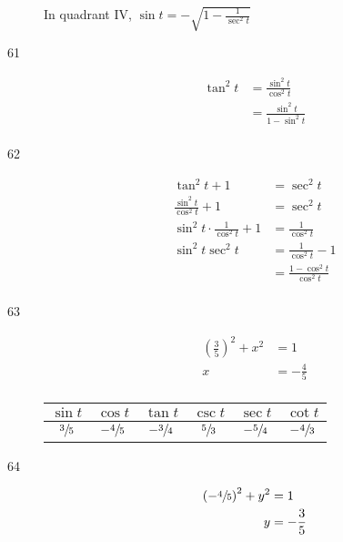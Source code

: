 \documentclass{exam}
\begin{document}
\begin{description}
        In quadrant IV, $\sin t = \boxed{ - \sqrt{ 1 - \frac{1}{\sec^2 t} } }$ 

      \item[61] 
        \begin{align*}
          \tan^2 t & = \frac{\sin^2 t}{\cos^2 t} \\
                   & = \boxed{ \frac{\sin^2 t}{1 - \sin^2 t} } \\
        \end{align*}

      \item[62] 
        \begin{align*}
          \tan^2 t + 1                          & = \sec^2 t \\
          \frac{\sin^2 t}{\cos^2 t} + 1         & = \sec^2 t \\
          \sin^2 t \cdot \frac{1}{\cos^2 t} + 1 & = \frac{1}{\cos^2 t} \\
          \sin^2 t \sec^2 t                     & = \frac{1}{\cos^2 t} - 1 \\
                                                & = \boxed{ \frac{1 - \cos^2 t}{\cos^2 t} } \\
        \end{align*}

      \item[63]
        \begin{align*}
          \left( \frac{3}{5} \right)^2 + x^2 & = 1 \\
          x                                  & = -\frac{4}{5} \\
        \end{align*}

        \begin{tabular}[H]{cccccc}
          \toprule
          $\sin t$      & $\cos t$        & $\tan t$        & $\csc t$      & $\sec t$        & $\cot t$ \\
          \midrule
          $\sfrac{3}{5}$ & $- \sfrac{4}{5}$ & $- \sfrac{3}{4}$ & $\sfrac{5}{3}$ & $- \sfrac{5}{4}$ & $- \sfrac{4}{3}$ \\
          \bottomrule
        \end{tabular}

      \pagebreak

      \item[64]
        \begin{align*}
          \left( - \sfrac{4}{5} \right)^2 + y^2 & = 1 \\
          y                                     & = -\frac{3}{5} \\
        \end{align*}


\end{description}
\end{document}

